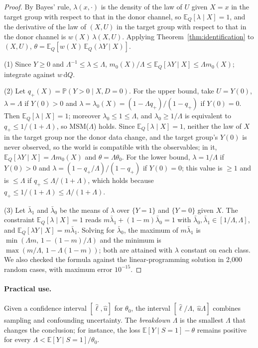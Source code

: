 \documentclass[11pt,a4paper]{article}
\newcommand{\E}{\mathbb{E}}
\newcommand{\PP}{\mathbb{P}}
\newcommand{\dd}{\,\mathrm{d}}
\theoremstyle{plain}
\theoremstyle{definition}
\begin{document}
\begin{proof}
By Bayes' rule, $\lambda(x,\cdot)$ is the density of the law of $U$ given $X=x$ in the target group with respect to that in the donor channel, so $\E_Q[\lambda\mid X]=1$, and the derivative of the law of $(X,U)$ in the target group with respect to that in the donor channel is $w(X)\,\lambda(X,U)$. Applying Theorem~\ref{thm:identification} to $(X,U)$, $\theta=\E_Q[w(X)\,\E_Q(\lambda Y\mid X)]$.

(1) Since $Y\ge0$ and $\Lambda^{-1}\le\lambda\le\Lambda$, $m_0(X)/\Lambda\le\E_Q[\lambda Y\mid X]\le\Lambda m_0(X)$; integrate against $w\dd Q$.

(2) Let $q_+(X)=\PP(Y>0\mid X,D=0)$. For the upper bound, take $U=Y(0)$, $\lambda=\Lambda$ if $Y(0)>0$ and $\lambda=\lambda_0(X)=(1-\Lambda q_+)/(1-q_+)$ if $Y(0)=0$. Then $\E_Q[\lambda\mid X]=1$; moreover $\lambda_0\le1\le\Lambda$, and $\lambda_0\ge1/\Lambda$ is equivalent to $q_+\le1/(1+\Lambda)$, so MSM($\Lambda$) holds. Since $\E_Q[\lambda\mid X]=1$, neither the law of $X$ in the target group nor the donor data change, and the target group's $Y(0)$ is never observed, so the world is compatible with the observables; in it, $\E_Q[\lambda Y\mid X]=\Lambda m_0(X)$ and $\theta=\Lambda\theta_0$. For the lower bound, $\lambda=1/\Lambda$ if $Y(0)>0$ and $\lambda=(1-q_+/\Lambda)/(1-q_+)$ if $Y(0)=0$; this value is $\ge1$ and is $\le\Lambda$ if $q_+\le\Lambda/(1+\Lambda)$, which holds because $q_+\le1/(1+\Lambda)\le\Lambda/(1+\Lambda)$.

(3) Let $\bar\lambda_1$ and $\bar\lambda_0$ be the means of $\lambda$ over $\{Y=1\}$ and $\{Y=0\}$ given $X$. The constraint $\E_Q[\lambda\mid X]=1$ reads $m\bar\lambda_1+(1-m)\bar\lambda_0=1$ with $\bar\lambda_0,\bar\lambda_1\in[1/\Lambda,\Lambda]$, and $\E_Q[\lambda Y\mid X]=m\bar\lambda_1$. Solving for $\bar\lambda_0$, the maximum of $m\bar\lambda_1$ is $\min(\Lambda m,\,1-(1-m)/\Lambda)$ and the minimum is $\max(m/\Lambda,\,1-\Lambda(1-m))$; both are attained with $\lambda$ constant on each class. We also checked the formula against the linear-programming solution in 2{,}000 random cases, with maximum error $10^{-15}$.
\end{proof}

\paragraph{Practical use.} Given a confidence interval $[\hat\ell,\hat u]$ for $\theta_0$, the interval $[\hat\ell/\Lambda,\ \hat u\Lambda]$ combines sampling and confounding uncertainty. The \emph{breakdown $\Lambda$} is the smallest $\Lambda$ that changes the conclusion; for instance, the loss $\E[Y\mid S=1]-\theta$ remains positive for every $\Lambda<\E[Y\mid S=1]/\theta_0$.
\end{document}
